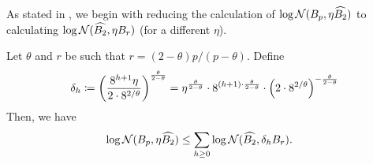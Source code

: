 \documentclass[11pt]{article}
\numberwithin{equation}{section}
\begin{document}
As stated in , we begin with reducing the calculation of $\log\mathcal{N}(B_p, \eta \widehat{B_2})$ to calculating $\log\mathcal{N}(\widehat{B_2}, \eta B_r)$ (for a different $\eta$).

\begin{lemma}
\label{lemma:poor_mans_dualization}
Let $\theta$ and $r$ be such that $r=(2-\theta)p/(p-\theta)$. Define
\begin{align*}
    \delta_h \coloneqq \left(\frac{8^{h+1}\eta}{2\cdot 8^{2/\theta}}\right)^{\frac{\theta}{2-\theta}} = \eta^{\frac{\theta}{2-\theta}}\cdot 8^{(h+1)\cdot\frac{\theta}{2-\theta}} \cdot \left(2\cdot 8^{2/\theta}\right)^{-\frac{\theta}{2-\theta}}
\end{align*}
Then, we have
\begin{align*}
     \log\mathcal{N}(B_p,\eta \widehat{B_2}) &\le \sum_{h\ge 0} \log\mathcal{N}(\widehat{B_2},\delta_hB_r).
\end{align*}
\end{lemma}
\end{document}
